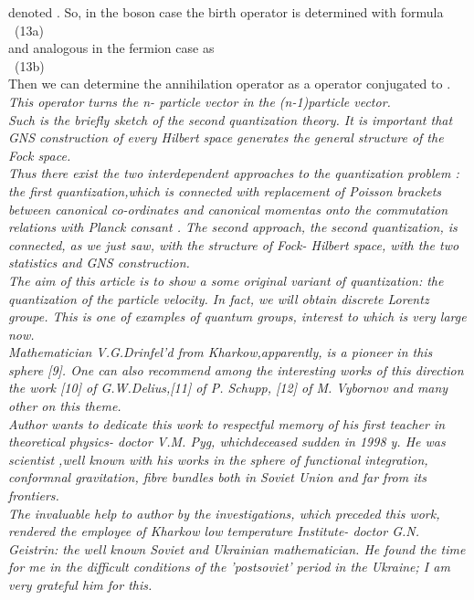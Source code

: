 \documentclass[a4paper,12pt] {article}
\begin{document}
 denoted \coordHE{}. So, in the boson case the birth operator is determined with formula
\\\coordHE{}\ (13a)\\ and analogous in the fermion case as
\\\coordHE{}\ (13b)
\\ Then we can determine the annihilation operator as a operator conjugated to  \coordHE{}.
 \it This operator turns the  \rm n- \it particle vector in the \rm (n-1)\it  particle vector.
\\ \rm Such is the briefly  sketch of the second quantization theory. It is important that GNS construction of
every Hilbert space   \coordHE{}   generates the general structure of the Fock space.
\\ Thus there exist the two interdependent approaches to the quantization problem : \it the first
 quantization,\rm which is connected with replacement of Poisson  brackets between canonical
 co-ordinates and canonical momentas  onto the commutation relations with Planck consant \myHighlight{$\hbar$}\coordHE{}. The
 second  approach,
\it the second quantization, \rm is  connected, as we just saw, with the structure of Fock- Hilbert space,
 with the two statistics and  GNS construction.\\
The aim of this article is to show a some original variant of quantization: the quantization of the
\it  particle   velocity. \rm In fact, we will obtain   \it discrete Lorentz groupe. \rm This is one of examples
of  \it quantum \rm  groups,  interest to which is very large now.
\\ Mathematician V.G.Drinfel'd from Kharkow,apparently, is a pioneer in this sphere [9]. One can also
recommend among the  interesting works of this direction the work [10] of G.W.Delius,[11] of P. Schupp,
 [12] of M. Vybornov and many other on this theme.\\
Author wants to   dedicate this work to respectful memory of his first teacher in theoretical physics-
doctor V.M. Pyg, whichdeceased sudden in 1998 y. He was  scientist ,well known with his works in the  sphere of functional integration, conformnal gravitation, fibre bundles both in Soviet Union and far from its frontiers.\\
The invaluable help to author by the investigations, which preceded this work, rendered the employee
 of  Kharkow low temperature Institute- doctor G.N. Geistrin: the well known Soviet and Ukrainian
mathematician. He found the time for me in the difficult conditions of  the 'postsoviet' period in the
 Ukraine; I am very grateful him for this.
\end{document}

